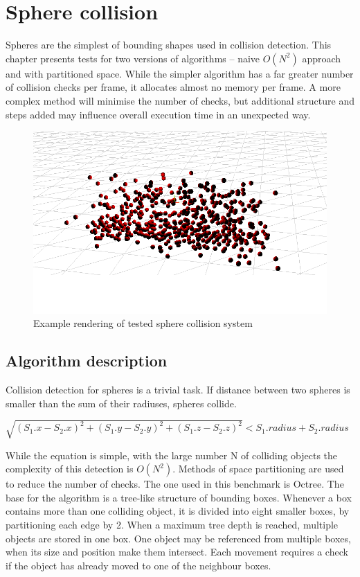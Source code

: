 \chapter{Sphere collision}
\label{cha:spherecollision}

Spheres are the simplest of bounding shapes used in collision detection. This chapter presents tests for two versions of algorithms -- naive $O(N^2)$ approach and with partitioned space. While the simpler algorithm has a far greater number of collision checks per frame, it allocates almost no memory per frame. A more complex method will minimise the number of checks, but additional structure and steps added may influence overall execution time in an unexpected way.


\begin{figure}[h!]
  \caption{Example rendering of tested sphere collision system}
  \label{img:spheres}
  \centering
	\includegraphics[width=16cm]{spheres/render.png}
\end{figure}

\section{Algorithm description}
\label{sec:spherealgorithmdescription}

Collision detection for spheres is a trivial task. If distance between two spheres is smaller than the sum of their radiuses, spheres collide.

$\sqrt{(S_1.x - S_2.x)^2 + (S_1.y - S_2.y)^2 + (S_1.z - S_2.z)^2} < S_1.radius + S_2.radius$

While the equation is simple, with the large number N of colliding objects the complexity of this detection is $O(N^2)$. Methods of space partitioning are used to reduce the number of checks. The one used in this benchmark is Octree.
The base for the algorithm is a tree-like structure of bounding boxes. Whenever a box contains more than one colliding object, it is divided into eight smaller boxes, by partitioning each edge by 2. When a maximum tree depth is reached, multiple objects are stored in one box. One object may be referenced from multiple boxes, when its size and position make them intersect. Each movement requires a check if the object has already moved to one of the neighbour boxes.

